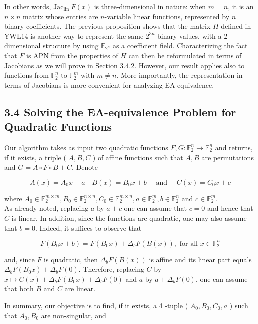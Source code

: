 \documentclass[10pt]{article}
\begin{document}
In other words, $\mathrm{Jac}_{\text {lin }} F(x)$ is three-dimensional in nature: when $m=n$, it is an $n \times n$ matrix whose entries are $n$-variable linear functions, represented by $n$ binary coefficients. The previous proposition shows that the matrix $H$ defined in YWL14 is another way to represent the same $2^{3 n}$ binary values, with a 2 -dimensional structure by using $\mathbb{F}_{2^{n}}$ as a coefficient field. Characterizing the fact that $F$ is APN from the properties of $H$ can then be reformulated in terms of Jacobians as we will prove in Section 3.4.2. However, our result applies also to functions from $\mathbb{F}_{2}^{n}$ to $\mathbb{F}_{2}^{m}$ with $m \neq n$. More importantly, the representation in terms of Jacobians is more convenient for analyzing EA-equivalence.

\subsection*{3.4 Solving the EA-equivalence Problem for Quadratic Functions}
Our algorithm takes as input two quadratic functions $F, G: \mathbb{F}_{2}^{n} \rightarrow \mathbb{F}_{2}^{n}$ and returns, if it exists, a triple ( $A, B, C$ ) of affine functions such that $A, B$ are permutations and $G=A \circ F \circ B+C$. Denote

$$
A(x)=A_{0} x+a \quad B(x)=B_{0} x+b \quad \text { and } \quad C(x)=C_{0} x+c
$$

where $A_{0} \in \mathbb{F}_{2}^{m \times m}, B_{0} \in \mathbb{F}_{2}^{n \times n}, C_{0} \in \mathbb{F}_{2}^{m \times n}, a \in \mathbb{F}_{2}^{m}, b \in \mathbb{F}_{2}^{n}$ and $c \in \mathbb{F}_{2}^{m}$.\\
As already noted, replacing $a$ by $a+c$ one can assume that $c=0$ and hence that $C$ is linear. In addition, since the functions are quadratic, one may also assume that $b=0$. Indeed, it suffices to observe that

$$
F\left(B_{0} x+b\right)=F\left(B_{0} x\right)+\Delta_{b} F(B(x)), \text { for all } x \in \mathbb{F}_{2}^{n}
$$

and, since $F$ is quadratic, then $\Delta_{b} F(B(x))$ is affine and its linear part equals $\Delta_{b} F\left(B_{0} x\right)+\Delta_{b} F(0)$. Therefore, replacing $C$ by $x \mapsto C(x)+\Delta_{b} F\left(B_{0} x\right)+\Delta_{b} F(0)$ and $a$ by $a+\Delta_{b} F(0)$, one can assume that both $B$ and $C$ are linear.

In summary, our objective is to find, if it exists, a 4 -tuple ( $A_{0}, B_{0}, C_{0}, a$ ) such that $A_{0}, B_{0}$ are non-singular, and
\end{document}
